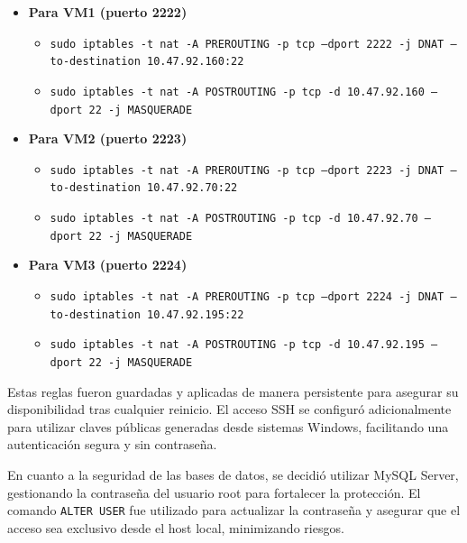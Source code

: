 \begin{itemize}
    \item \textbf{Para VM1 (puerto 2222)}
    \begin{itemize}
        \item \texttt{sudo iptables -t nat -A PREROUTING -p tcp --dport 2222 -j \newline
        DNAT --to-destination 10.47.92.160:22}
        
        \item \texttt{sudo iptables -t nat -A POSTROUTING -p tcp -d 10.47.92.160 \newline
        --dport 22 -j MASQUERADE}
    \end{itemize}
    
    \item \textbf{Para VM2 (puerto 2223)}
    \begin{itemize}
        \item \texttt{sudo iptables -t nat -A PREROUTING -p tcp --dport 2223 -j \newline
        DNAT --to-destination 10.47.92.70:22}
        
        \item \texttt{sudo iptables -t nat -A POSTROUTING -p tcp -d 10.47.92.70 \newline
        --dport 22 -j MASQUERADE}
    \end{itemize}
    
    \item \textbf{Para VM3 (puerto 2224)}
    \begin{itemize}
        \item \texttt{sudo iptables -t nat -A PREROUTING -p tcp --dport 2224 -j \newline
        DNAT --to-destination 10.47.92.195:22}
        
        \item \texttt{sudo iptables -t nat -A POSTROUTING -p tcp -d 10.47.92.195 \newline
        --dport 22 -j MASQUERADE}
    \end{itemize}
\end{itemize}


Estas reglas fueron guardadas y aplicadas de manera persistente para asegurar su disponibilidad tras cualquier reinicio. El acceso SSH se configuró adicionalmente para utilizar claves públicas generadas desde sistemas Windows, facilitando una autenticación segura y sin contraseña.

En cuanto a la seguridad de las bases de datos, se decidió utilizar MySQL Server, gestionando la contraseña del usuario root para fortalecer la protección. El comando \texttt{ALTER USER} fue utilizado para actualizar la contraseña y asegurar que el acceso sea exclusivo desde el host local, minimizando riesgos.

